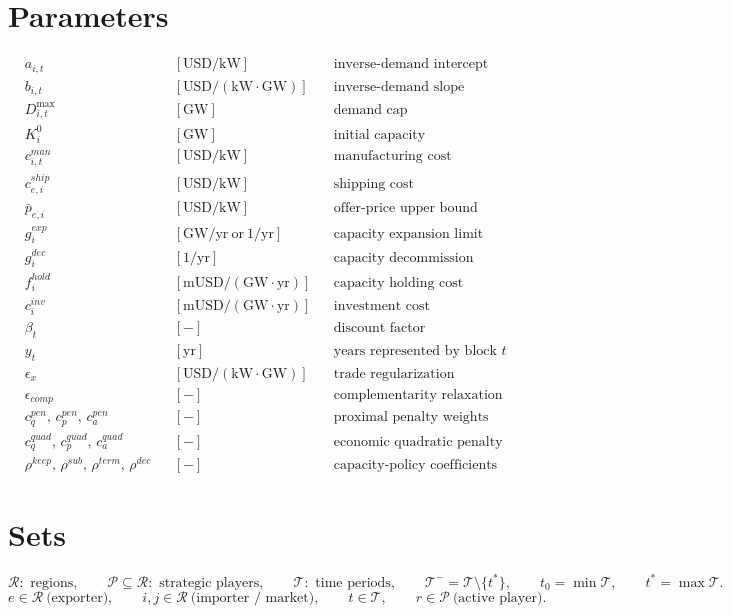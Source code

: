 \documentclass[11pt]{article}
\begin{document}
\section*{Parameters}
\[
\begin{alignedat}{3}
&a_{i,t} &&[\mathrm{USD}/\mathrm{kW}] &&\text{inverse-demand intercept} \\
&b_{i,t} &&[\mathrm{USD}/(\mathrm{kW}\cdot\mathrm{GW})] &&\text{inverse-demand slope} \\
&D^{\max}_{i,t} &&[\mathrm{GW}] &&\text{demand cap} \\
&K_i^0 &&[\mathrm{GW}] &&\text{initial capacity} \\
&c^{man}_{i,t} &&[\mathrm{USD}/\mathrm{kW}] &&\text{manufacturing cost schedule} \\
&c^{ship}_{e,i} &&[\mathrm{USD}/\mathrm{kW}] &&\text{shipping cost} \\
&\bar p_{e,i} &&[\mathrm{USD}/\mathrm{kW}] &&\text{offer-price upper bound} \\
&g_i^{exp} &&[\mathrm{GW/yr}\ \text{or}\ 1/\mathrm{yr}] &&\text{capacity expansion limit} \\
&g_i^{dec} &&[1/\mathrm{yr}] &&\text{capacity decommission limit} \\
&f_i^{hold} &&[\mathrm{mUSD}/(\mathrm{GW}\cdot\mathrm{yr})] &&\text{capacity holding cost} \\
&c_i^{inv} &&[\mathrm{mUSD}/(\mathrm{GW}\cdot\mathrm{yr})] &&\text{investment cost} \\
&\beta_t &&[-] &&\text{discount factor} \\
&y_t &&[\mathrm{yr}] &&\text{years represented by block } t \\
&\epsilon_x &&[\mathrm{USD}/(\mathrm{kW}\cdot\mathrm{GW})] &&\text{trade regularization} \\
&\epsilon_{comp} &&[-] &&\text{complementarity relaxation} \\
&c_q^{pen},\,c_p^{pen},\,c_a^{pen} &&[-] &&\text{proximal penalty weights} \\
&c_q^{quad},\,c_p^{quad},\,c_a^{quad} &&[-] &&\text{economic quadratic penalty weights} \\
&\rho^{keep},\,\rho^{sub},\,\rho^{term},\,\rho^{dec} &&[-] &&\text{capacity-policy coefficients}
\end{alignedat}
\]

\section*{Sets}
\[
\mathcal{R}:\text{ regions},\qquad
\mathcal{P}\subseteq\mathcal{R}:\text{ strategic players},\qquad
\mathcal{T}:\text{ time periods},\qquad
\mathcal{T}^{-}=\mathcal{T}\setminus\{t^*\},\qquad
t_0=\min\mathcal{T},\qquad
t^*=\max\mathcal{T}.
\]
\[
e\in\mathcal{R}\ \text{(exporter)},\qquad
i,j\in\mathcal{R}\ \text{(importer / market)},\qquad
t\in\mathcal{T},\qquad
r\in\mathcal{P}\ \text{(active player)}.
\]
\end{document}
